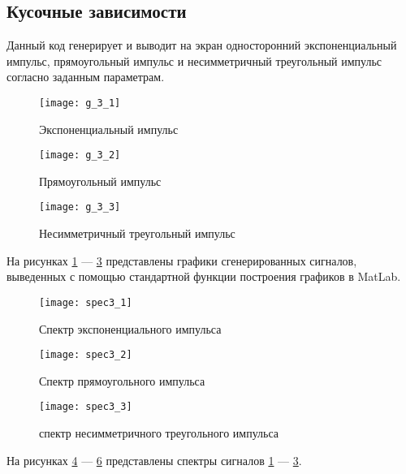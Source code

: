 \subsection{Кусочные зависимости}


\parindent=1cm
Данный код генерирует и выводит на экран односторонний экспоненциальный импульс, прямоугольный импульс и несимметричный треугольный импульс согласно заданным параметрам.

\begin{figure}[H]
	\begin{center}
		\texttt{[image: g\_3\_1]}
		\caption{Экспоненциальный импульс} 
		\label{pic:g_3_1} %
	\end{center}
\end{figure}
\begin{figure}[H]
	\begin{center}
		\texttt{[image: g\_3\_2]}
		\caption{Прямоугольный импульс} 
		\label{pic:g_3_2} %
	\end{center}
\end{figure}
\begin{figure}[H]
	\begin{center}
		\texttt{[image: g\_3\_3]}
		\caption{Несимметричный треугольный импульс} 
		\label{pic:g_3_3} %
	\end{center}
\end{figure}
На рисунках  \ref{pic:g_3_1} — \ref{pic:g_3_3} представлены графики сгенерированных сигналов, выведенных с помощью стандартной функции построения графиков в MatLab.

\begin{figure}[H]
	\begin{center}
		\texttt{[image: spec3\_1]}
		\caption{Спектр экспоненциального импульса} 
		\label{pic:spec3_1} %
	\end{center}
\end{figure}
\begin{figure}[H]
	\begin{center}
		\texttt{[image: spec3\_2]}
		\caption{Спектр прямоугольного импульса} 
		\label{pic:spec3_2} %
	\end{center}
\end{figure}
\begin{figure}[H]
	\begin{center}
		\texttt{[image: spec3\_3]}
		\caption{спектр несимметричного треугольного импульса} 
		\label{pic:spec3_3} %
	\end{center}
\end{figure}
На рисунках  \ref{pic:spec3_1} — \ref{pic:spec3_3} представлены спектры сигналов \ref{pic:g_3_1} — \ref{pic:g_3_3}.

